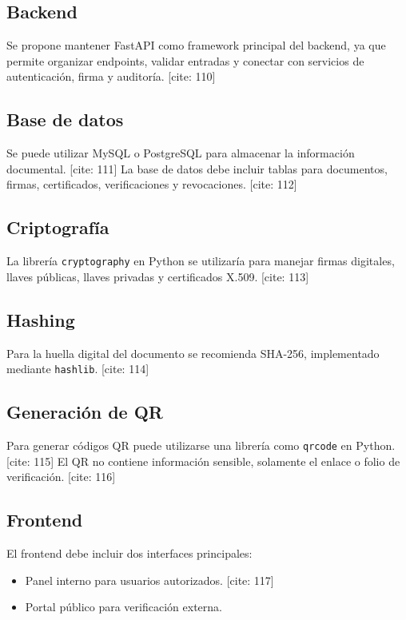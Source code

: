 \documentclass[10pt]{article} [cite: 1]
\begin{document}
\subsection{Backend}

Se propone mantener FastAPI como framework principal del backend, ya que permite organizar endpoints, validar entradas y conectar con servicios de autenticación, firma y auditoría. [cite: 110]

\subsection{Base de datos}

Se puede utilizar MySQL o PostgreSQL para almacenar la información documental. [cite: 111] La base de datos debe incluir tablas para documentos, firmas, certificados, verificaciones y revocaciones. [cite: 112]

\subsection{Criptografía}

La librería \texttt{cryptography} en Python se utilizaría para manejar firmas digitales, llaves públicas, llaves privadas y certificados X.509. [cite: 113]

\subsection{Hashing}

Para la huella digital del documento se recomienda SHA-256, implementado mediante \texttt{hashlib}. [cite: 114]

\subsection{Generación de QR}

Para generar códigos QR puede utilizarse una librería como \texttt{qrcode} en Python. [cite: 115] El QR no contiene información sensible, solamente el enlace o folio de verificación. [cite: 116]

\subsection{Frontend}

El frontend debe incluir dos interfaces principales:

\begin{itemize}
    \item Panel interno para usuarios autorizados. [cite: 117]
    \item Portal público para verificación externa.
\end{itemize}
\end{document}
